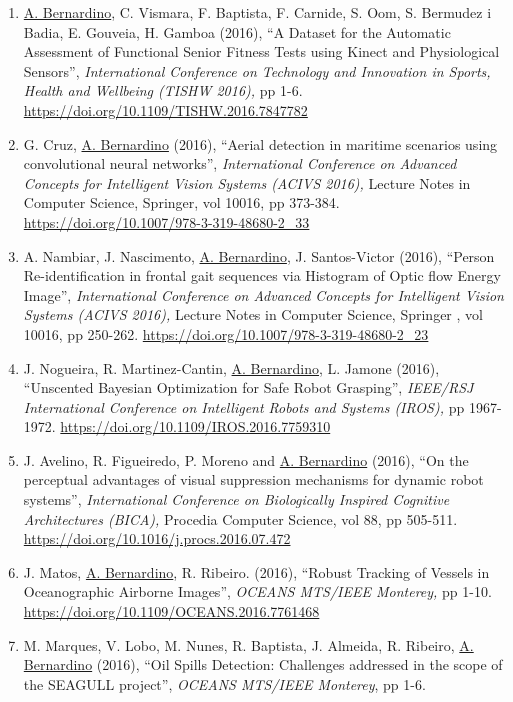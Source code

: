 \documentclass[
]{article}
\begin{document}
\begin{enumerate}
\item
  \ul{A. Bernardino}, C. Vismara, F. Baptista, F. Carnide, S. Oom, S.
  Bermudez i Badia, E. Gouveia, H. Gamboa (2016), ``A Dataset for the
  Automatic Assessment of Functional Senior Fitness Tests using Kinect
  and Physiological Sensors'', \emph{International Conference on
  Technology and Innovation in Sports, Health and Wellbeing (TISHW
  2016),} pp 1-6. \url{https://doi.org/10.1109/TISHW.2016.7847782}~
\item
  G. Cruz, \ul{A. Bernardino} (2016), ``Aerial detection in maritime
  scenarios using convolutional neural networks'', \emph{International
  Conference on Advanced Concepts for Intelligent Vision Systems (ACIVS
  2016),} Lecture Notes in Computer Science, Springer, vol 10016, pp
  373-384. \url{https://doi.org/10.1007/978-3-319-48680-2_33}~
\item
  A. Nambiar, J. Nascimento, \ul{A. Bernardino}, J. Santos-Victor
  (2016), ``Person Re-identification in frontal gait sequences via
  Histogram of Optic flow Energy Image'', \emph{International Conference
  on Advanced Concepts for Intelligent Vision Systems (ACIVS 2016),}
  Lecture Notes in Computer Science, Springer , vol 10016, pp 250-262.
  \url{https://doi.org/10.1007/978-3-319-48680-2_23}~
\item
  J. Nogueira, R. Martinez-Cantin, \ul{A. Bernardino}, L. Jamone (2016),
  ``Unscented Bayesian Optimization for Safe Robot Grasping'',
  \emph{IEEE/RSJ International Conference on Intelligent Robots and
  Systems (IROS),} pp 1967-1972.
  \url{https://doi.org/10.1109/IROS.2016.7759310}~
\item
  J. Avelino, R. Figueiredo, P. Moreno and \ul{A. Bernardino} (2016),
  ``On the perceptual advantages of visual suppression mechanisms for
  dynamic robot systems'', \emph{International Conference on
  Biologically Inspired Cognitive Architectures (BICA),} Procedia
  Computer Science, vol 88, pp 505-511.
  \url{https://doi.org/10.1016/j.procs.2016.07.472}
\item
  J. Matos, \ul{A. Bernardino}, R. Ribeiro. (2016), ``Robust Tracking of
  Vessels in Oceanographic Airborne Images'',
  \emph{OCEANS MTS/IEEE Monterey,} pp 1-10.
  \url{https://doi.org/10.1109/OCEANS.2016.7761468}~
\item
  M. Marques, V. Lobo, M. Nunes, R. Baptista, J. Almeida, R. Ribeiro,
  \ul{A. Bernardino} (2016), ``Oil Spills Detection: Challenges
  addressed in the scope of the SEAGULL project'',
  \emph{OCEANS MTS/IEEE Monterey}, pp 1-6.

\end{enumerate}
\end{document}
